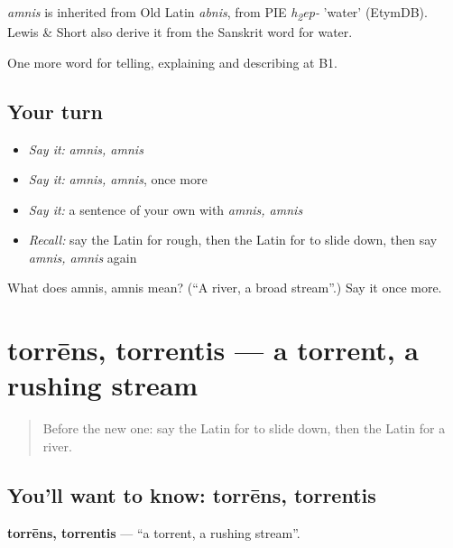 \begin{cousinweb}
\emph{amnis} is inherited from Old Latin \emph{abnis}, from PIE \emph{h\textsubscript{2}ep-} 'water' (EtymDB). Lewis \& Short also derive it from the Sanskrit word for water.
\end{cousinweb}

\begin{grammarlens}[title={What you've built}]
One more word for telling, explaining and describing at B1.
\end{grammarlens}

\subsection*{Your turn}
\begin{itemize}
\raggedright
  \item \emph{Say it:} \emph{amnis, amnis}
  \item \emph{Say it:} \emph{amnis, amnis}, once more
  \item \emph{Say it:} a sentence of your own with \emph{amnis, amnis}
  \item \emph{Recall:} say the Latin for rough, then the Latin for to slide down, then say \emph{amnis, amnis} again
\end{itemize}

\begin{tcolorbox}[breakable,colback=teal!4,colframe=teal!35!black,title={Before you move on}]
What does amnis, amnis mean? (\textquotedblleft{}A river, a broad stream\textquotedblright{}.) Say it once more.
\end{tcolorbox}
\section[torrēns, torrentis]{torrēns, torrentis — a torrent, a rushing stream}

\label{lesson:LA-C482-torrens}



\begin{quote}
Before the new one: say the Latin for to slide down, then the Latin for a river.
\end{quote}

\subsection*{You'll want to know: torrēns, torrentis}
\textbf{torrēns, torrentis} — \textquotedblleft{}a torrent, a rushing stream\textquotedblright{}.

